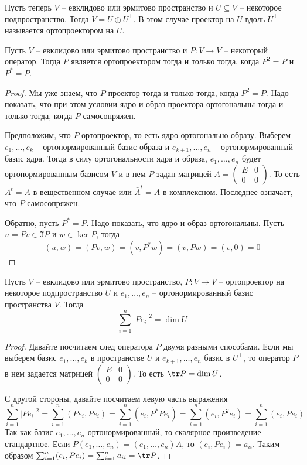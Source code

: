 Пусть теперь $V$ -- евклидово или эрмитово пространство и $U\subseteq V$ -- некоторое подпространство.
Тогда $V = U\oplus U^\bot$.
В этом случае проектор на $U$ вдоль $U^\bot$ называется ортопроектором на $U$.

\begin{claim}
Пусть $V$ -- евклидово или эрмитово пространство и $P\colon V\to V$ -- некоторый оператор.
Тогда $P$ является ортопроектором тогда и только тогда, когда $P^2 = P$ и $P^* = P$.
\end{claim}
\begin{proof}
Мы уже знаем, что $P$ проектор тогда и только тогда, когда $P^2 = P$.
Надо показать, что при этом условии ядро и образ проектора ортогональны тогда и только тогда, когда $P$ самосопряжен.

Предположим, что $P$ ортопроектор, то есть ядро ортогонально образу.
Выберем $e_1,\ldots,e_k$ -- ортонормированный базис образа и $e_{k+1}, \ldots,e_n$ -- ортонормированный базис ядра.
Тогда в силу ортогональности ядра и образа, $e_1,\ldots,e_n$ будет ортонормированным базисом $V$ и в нем $P$ задан матрицей $A=\left(\begin{smallmatrix}{E}&{0}\\{0}&{0}\end{smallmatrix}\right)$.
То есть $A^t = A$ в вещественном случае или $\bar A^t  = A$ в комплексном.
Последнее означает, что $P$ самосопряжен.

Обратно, пусть $P^* = P$.
Надо показать, что ядро и образ ортогональны.
Пусть $u = Pv\in \Im P$ и $w \in \ker P$, тогда
\[
(u, w) = (Pv, w) = (v, P^*w) = (v, Pw) = (v, 0) = 0
\]
\end{proof}

\begin{claim}
\label{claim::BasisProj}
Пусть $V$ -- евклидово или эрмитово пространство, $P\colon V\to V$ -- ортопроектор на некоторое подпространство $U$ и $e_1,\ldots,e_n$ -- ортонормированный базис пространства $V$.
Тогда
\[
\sum_{i=1}^n |Pe_i|^2 = \dim U
\]
\end{claim}
\begin{proof}
Давайте посчитаем след оператора $P$ двумя разными способами.
Если мы выберем базис $e_1,\ldots,e_k$ в пространстве $U$ и $e_{k+1}, \ldots,e_n$ базис в $U^\bot$, то оператор $P$ в нем задается матрицей $\left(\begin{smallmatrix}{E}&{0}\\{0}&{0}\end{smallmatrix}\right)$.
То есть $\tr P = \dim U$.

С другой стороны, давайте посчитаем левую часть выражения
\[
\sum_{i=1}^n |Pe_i|^2 = \sum_{i=1}^n (Pe_i, Pe_i) = \sum_{i=1}^n (e_i, P^*Pe_i) = \sum_{i=1}^n (e_i, P^2e_i) = \sum_{i=1}^n (e_i, Pe_i)
\]
Так как базис $e_1,\ldots,e_n$ ортонормированный, то скалярное произведение стандартное.
Если $P(e_1,\ldots,e_n) = (e_1,\ldots,e_n)A$, то $(e_i, Pe_i) = a_{ii}$.
Таким образом $ \sum_{i=1}^n (e_i, Pe_i) = \sum_{i=1}^na_{ii} = \tr P$.
\end{proof}


